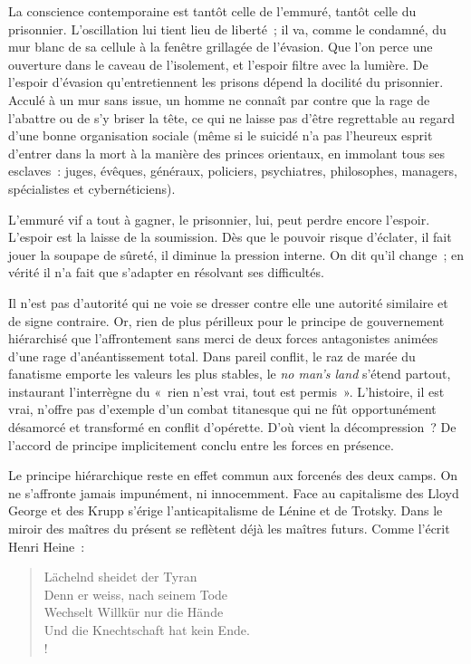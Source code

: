 \documentclass[french,twoside]{book} %
\newenvironment{quoteblock}%
  {\begin{quoting}}
  {\end{quoting}}
\newenvironment{quotebar}{%
    \def\FrameCommand{{\color{rubric!10!}\vrule width 0.5em} \hspace{0.9em}}%
    \def\OuterFrameSep{\itemsep} %
    \MakeFramed {\advance\hsize-\width \FrameRestore}
  }%
  {%
    \endMakeFramed
  }
\renewenvironment{quoteblock}%
  {%
    \savenotes
    \setstretch{0.9}
    \normalfont
    \begin{quotebar}
  }
  {%
    \end{quotebar}
    \spewnotes
  }
\begin{document}
\noindent La conscience contemporaine est tantôt celle de l’emmuré, tantôt celle du prisonnier. L’oscillation lui tient lieu de liberté ; il va, comme le condamné, du mur blanc de sa cellule à la fenêtre grillagée de l’évasion. Que l’on perce une ouverture dans le caveau de l’isolement, et l’espoir filtre avec la lumière. De l’espoir d’évasion qu’entretiennent les prisons dépend la docilité du prisonnier. Acculé à un mur sans issue, un homme ne connaît par contre que la rage de l’abattre ou de s’y briser la tête, ce qui ne laisse pas d’être regrettable au regard d’une bonne organisation sociale (même si le suicidé n’a pas l’heureux esprit d’entrer dans la mort à la manière des princes orientaux, en immolant tous ses esclaves : juges, évêques, généraux, policiers, psychiatres, philosophes, managers, spécialistes et cybernéticiens).\par
L’emmuré vif a tout à gagner, le prisonnier, lui, peut perdre encore l’espoir. L’espoir est la laisse de la soumission. Dès que le pouvoir risque d’éclater, il fait jouer la soupape de sûreté, il diminue la pression interne. On dit qu’il change ; en vérité il n’a fait que s’adapter en résolvant ses difficultés.\par
Il n’est pas d’autorité qui ne voie se dresser contre elle une autorité similaire et de signe contraire. Or, rien de plus périlleux pour le principe de gouvernement hiérarchisé que l’affrontement sans merci de deux forces antagonistes animées d’une rage d’anéantissement total. Dans pareil conflit, le raz de marée du fanatisme emporte les valeurs les plus stables, le \emph{no man’s land} s’étend partout, instaurant l’interrègne du « rien n’est vrai, tout est permis ». L’histoire, il est vrai, n’offre pas d’exemple d’un combat titanesque qui ne fût opportunément désamorcé et transformé en conflit d’opérette. D’où vient la décompression ? De l’accord de principe implicitement conclu entre les forces en présence.\par
Le principe hiérarchique reste en effet commun aux forcenés des deux camps. On ne s’affronte jamais impunément, ni innocemment. Face au capitalisme des Lloyd George et des Krupp s’érige l’anticapitalisme de Lénine et de Trotsky. Dans le miroir des maîtres du présent se reflètent déjà les maîtres futurs. Comme l’écrit Henri Heine :\par


\begin{verse}
Lächelnd sheidet der Tyran\\
Denn er weiss, nach seinem Tode\\
Wechselt Willkür nur die Hände\\
Und die Knechtschaft hat kein Ende.\\!
\end{verse}
\begin{quoteblock}
\end{quoteblock}
\end{document}
